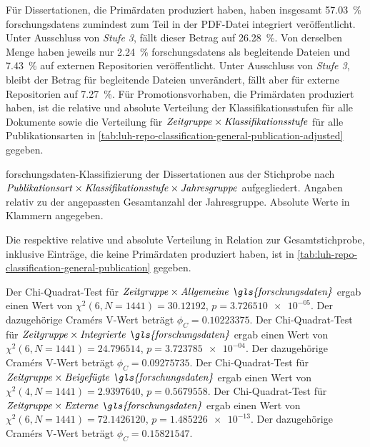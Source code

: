 Für Dissertationen, die Primärdaten produziert haben, haben insgesamt \SI{57,03}{\percent} \glspl{forschungsdaten} zumindest zum Teil in der PDF-Datei integriert veröffentlicht.
Unter Ausschluss von \textit{Stufe 3}, fällt dieser Betrag auf \SI{26,28}{\percent}.
Von derselben Menge haben jeweils nur \SI{2,24}{\percent} \glspl{forschungsdaten} als begleitende Dateien und \SI{7,43}{\percent} auf externen Repositorien veröffentlicht.
Unter Ausschluss von \textit{Stufe 3}, bleibt der Betrag für begleitende Dateien unverändert, fällt aber für externe Repositorien auf \SI{7,27}{\percent}.
Für Promotionsvorhaben, die Primärdaten produziert haben, ist die relative und absolute Verteilung der Klassifikationsstufen für alle Dokumente sowie die Verteilung für $\text{\textit{Zeitgruppe}}\times\text{\textit{Klassifikationsstufe}}$ für alle Publikationsarten in \cref{tab:luh-repo-classification-general-publication-adjusted} gegeben.
\begin{table}[!htbp]
	\caption{\gls{forschungsdaten}-Klassifizierung der Dissertationen aus der Stichprobe nach $\text{\textit{Publikationsart}}\times\text{\textit{Klassifikationsstufe}}\times\text{\textit{Jahresgruppe}}$ aufgegliedert.
    Angaben relativ zu der angepassten Gesamtanzahl der Jahresgruppe.
    Absolute Werte in Klammern angegeben.}
    
    \label{tab:luh-repo-classification-general-publication-adjusted}
\end{table}
Die respektive relative und absolute Verteilung in Relation zur Gesamtstichprobe, inklusive Einträge, die keine Primärdaten produziert haben, ist in \cref{tab:luh-repo-classification-general-publication} gegeben.

Der Chi-Quadrat-Test für $\text{\textit{Zeitgruppe}}\times\text{\textit{Allgemeine \gls{forschungsdaten}}}$ ergab einen Wert von $\chi^2 (\num{6}, N = \num{1441}) = \num[round-mode=places,round-precision=3]{30.12192}$, $p = \num[round-mode=places,round-precision=3]{3.726510e-05}$.
Der dazugehörige Cramérs V-Wert beträgt $\phi_C=\num[round-mode=places,round-precision=3]{0.10223375}$.
Der Chi-Quadrat-Test für $\text{\textit{Zeitgruppe}}\times\text{\textit{Integrierte \gls{forschungsdaten}}}$ ergab einen Wert von $\chi^2 (\num{6}, N = \num{1441}) = \num[round-mode=places,round-precision=3]{24.796514}$, $p = \num[round-mode=places,round-precision=3]{3.723785e-04}$.
Der dazugehörige Cramérs V-Wert beträgt $\phi_C=\num[round-mode=places,round-precision=3]{0.09275735}$.
Der Chi-Quadrat-Test für $\text{\textit{Zeitgruppe}}\times\text{\textit{Beigefügte \gls{forschungsdaten}}}$ ergab einen Wert von $\chi^2 (\num{4}, N = \num{1441}) = \num[round-mode=places,round-precision=3]{2.9397640}$, $p = \num[round-mode=places,round-precision=3]{0.5679558}$.
Der Chi-Quadrat-Test für $\text{\textit{Zeitgruppe}}\times\text{\textit{Externe \gls{forschungsdaten}}}$ ergab einen Wert von $\chi^2 (\num{6}, N = \num{1441}) = \num[round-mode=places,round-precision=3]{72.1426120}$, $p = \num[round-mode=places,round-precision=3]{1.485226e-13}$.
Der dazugehörige Cramérs V-Wert beträgt $\phi_C=\num[round-mode=places,round-precision=3]{0.15821547}$.

